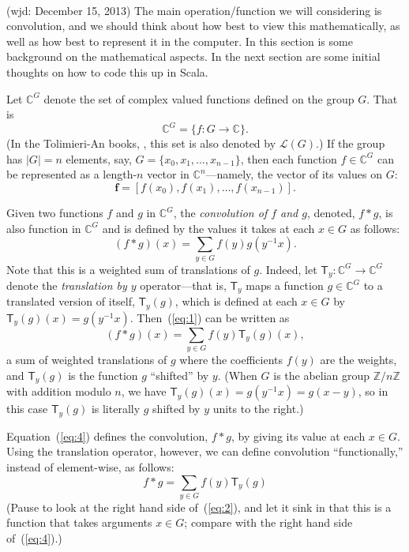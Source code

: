 \documentclass[11pt]{article}
\newcommand\C{\ensuremath{\mathbb{C}}}
\newcommand\Z{\ensuremath{\mathbb{Z}}}
\newcommand\vf{\ensuremath{\mathbf{f}}}
\newcommand\sL{\ensuremath{\mathcal{L}}}
\newcommand{\lt}[1]{\ensuremath{\mathsf{#1}}}
\newcommand{\T}{\lt{T}}       %
\begin{document}
\\[5pt]  (wjd: December 15, 2013)
The main operation/function we will considering is convolution, and we should
think about how best to view this mathematically, as well as how best to
represent it in the computer.  In this section is some background on the
mathematical aspects.  In the next section are some initial thoughts on how to
code this up in Scala.

Let $\C^G$ denote the set of complex valued functions defined on the group
$G$.  That is 
\[
\C^G = \{f : G\rightarrow \C \}.
\]
(In the Tolimieri-An books, \cite{Tolimieri:1998} \cite{Tolimieri:2003}, this set is also denoted by
$\sL(G)$.)  If the group has $|G| = n$ elements, say, 
$G = \{x_0, x_1, \dots, x_{n-1}\}$, 
then each function $f\in  \C^G$ can be represented as
a length-$n$ vector in $\C^n$---namely, the vector of its values on $G$:
\[
\vf = [f(x_0), f(x_1), \dots, f(x_{n-1})].
\]

Given two functions $f$ and $g$ in $\C^G$, the \emph{convolution of
$f$ and $g$}, denoted, $f*g$, is also function in $\C^G$ and is
defined by the values it takes at each $x\in G$ as follows:
\begin{equation}
\label{eq:1}  
(f*g)(x) = \sum_{y \in G} f(y) g(y^{-1}x).
\end{equation}
Note that this is a weighted sum of translations of $g$.
Indeed, let $\T_y: \C^G\rightarrow \C^G$ denote
the \emph{translation by $y$} operator---that is, $\T_y$ maps 
a function $g\in \C^G$ to a translated version of itself, $\T_y(g)$, which is defined at each 
$x \in G$ by $\T_y(g)(x) = g(y^{-1}x)$.
Then~(\ref{eq:1}) can be written as
\begin{equation}
\label{eq:4}  
(f*g)(x) = \sum_{y \in G} f(y) \T_y(g)(x),
\end{equation}
a sum of weighted translations of $g$ where 
the coefficients $f(y)$ are the weights, and 
$\T_y(g)$ is the function $g$ ``shifted'' by $y$. (When $G$ is the abelian
group $\Z/n\Z$ with addition modulo $n$, we have
$\T_y(g)(x) = g(y^{-1}x) = g(x-y)$, so in this case
$\T_y(g)$ is literally $g$ shifted by $y$ units to the right.)

Equation~(\ref{eq:4}) defines the convolution, $f * g$, by giving its
value at each $x\in G$. Using the 
translation operator, however, we can define convolution
 ``functionally,'' instead of element-wise, as follows:
\begin{equation}
\label{eq:2}  
f*g = \sum_{y \in G} f(y) \T_y(g)
\end{equation}
(Pause to look at the right hand side of~(\ref{eq:2}), and let it sink in that
this is a function that takes arguments $x\in G$; compare with the right
hand side of~(\ref{eq:4}).)
\end{document}
